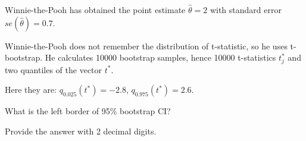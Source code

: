
\begin{question}
Winnie-the-Pooh has obtained the point estimate \(\hat\theta = 2\)
with standard error \(se(\hat\theta)= 0.7\).

Winnie-the-Pooh does not remember the distribution of t-statistic,
so he uses t-bootstrap.
He calculates 10000 bootstrap samples, hence 10000 t-statistics \(t^*_j\) and
two quantiles of the vector \(t^*\).

Here they are: \(q_{0.025}(t^*) = -2.8\), \(q_{0.975}(t^*)= 2.6\).

What is the left border of 95\% bootstrap CI?

Provide the answer with 2 decimal digits.
\end{question}


